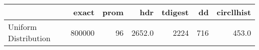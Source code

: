 \begin{tabular}{lrrrrrr}
\toprule
{} &   exact &  prom &     hdr &  tdigest &   dd &  circllhist \\
\midrule
Uniform Distribution &  800000 &    96 &  2652.0 &     2224 &  716 &       453.0 \\
\bottomrule
\end{tabular}
